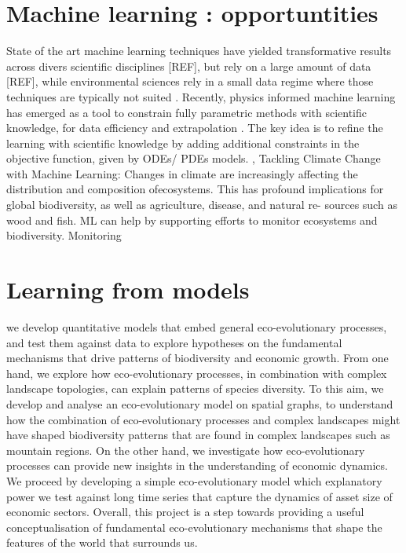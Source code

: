 \section{Machine learning : opportuntities}
\begin{outline}
    \1 State of the art machine learning techniques have yielded transformative results across divers scientific disciplines [REF], but rely on a large amount of data [REF], while environmental sciences rely in a small data regime where those techniques are typically not suited \cite{Raissi2019a}. Recently, physics informed machine learning has emerged as a tool to constrain fully parametric methods with scientific knowledge, for data efficiency and extrapolation \cite{Raissi2019a}. The key idea is to refine the learning with scientific knowledge by adding additional constraints in the objective function, given by ODEs/ PDEs models.
    \1 \cite{Karpatne2017}
    \1 \cite{Rolnick2023}, Tackling Climate Change with Machine Learning: Changes in climate are increasingly affecting the distribution and composition ofecosystems. This has profound implications for global biodiversity, as well as agriculture, disease, and natural re- sources such as wood and fish. ML can help by supporting efforts to monitor ecosystems and biodiversity.
    Monitoring
\end{outline}

\section{Learning from models}
\begin{outline}
    \1 we develop quantitative models that embed general eco-evolutionary processes, and test them against data to explore hypotheses on the fundamental mechanisms that drive patterns of biodiversity and economic growth.
        \2 From one hand, we explore how eco-evolutionary processes, in combination with complex landscape topologies, can explain patterns of species diversity.
        \2 To this aim, we develop and analyse an eco-evolutionary model on spatial graphs, to understand how the combination of eco-evolutionary processes and complex landscapes might have shaped biodiversity patterns that are found in complex landscapes such as mountain regions.
        \2 On the other hand, we investigate how eco-evolutionary processes can provide new insights in the understanding of economic dynamics.
        \2 We proceed by developing a simple eco-evolutionary model which explanatory power we test against long time series that capture the dynamics of asset size of economic sectors.
    \1 Overall, this project is a step towards providing a useful conceptualisation of fundamental eco-evolutionary mechanisms that shape the features of the world that surrounds us.
\end{outline}


